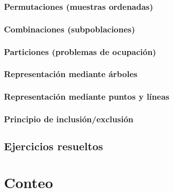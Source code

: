 \documentclass[
]{book}
\begin{document}
\hypertarget{permutaciones-muestras-ordenadas}{%
\subsection{Permutaciones (muestras ordenadas)}\label{permutaciones-muestras-ordenadas}}

\hypertarget{combinaciones-subpoblaciones}{%
\subsection{Combinaciones (subpoblaciones)}\label{combinaciones-subpoblaciones}}

\hypertarget{particiones-problemas-de-ocupaciuxf3n}{%
\subsection{Particiones (problemas de ocupación)}\label{particiones-problemas-de-ocupaciuxf3n}}

\hypertarget{representaciuxf3n-mediante-uxe1rboles}{%
\subsection{Representación mediante árboles}\label{representaciuxf3n-mediante-uxe1rboles}}

\hypertarget{representaciuxf3n-mediante-puntos-y-luxedneas}{%
\subsection{Representación mediante puntos y líneas}\label{representaciuxf3n-mediante-puntos-y-luxedneas}}

\hypertarget{principio-de-inclusiuxf3nexclusiuxf3n}{%
\subsection{Principio de inclusión/exclusión}\label{principio-de-inclusiuxf3nexclusiuxf3n}}

\hypertarget{ejercicios-resueltos}{%
\section{Ejercicios resueltos}\label{ejercicios-resueltos}}

\hypertarget{conteo}{%
\chapter{Conteo}\label{conteo}}
\end{document}
